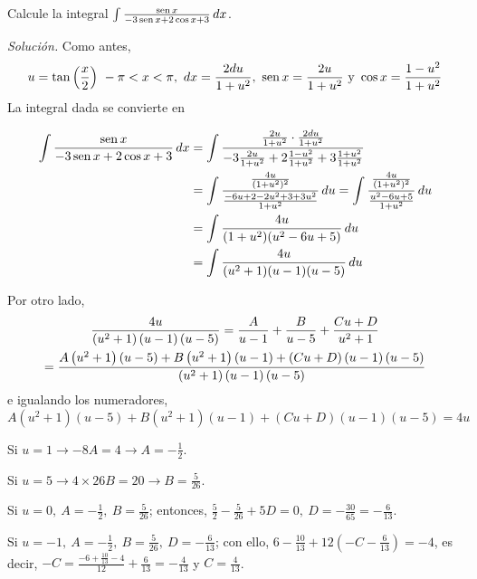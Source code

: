 \begin{ejemplo}
  Calcule la integral $\int \frac{\operatorname{sen} x}{-3\operatorname{sen} x+2\cos x+3}\, dx $.
\end{ejemplo}
\emph{Solución.} Como antes,
\begin{gather*}
  u=\tan \left( \frac{x}{2}\right)\ -\pi<x<\pi,\ dx=\frac{2du}{1+u^{2}},\ \operatorname{sen} x=\frac{2u}{1+u^{2}}\text{ y }\cos x=\frac{1-u^{2}}{1+u^{2}}
\end{gather*}
La integral dada se convierte en
\begin{small}
  \begin{align*}
    \int \frac{\operatorname{sen} x}{-3\operatorname{sen} x + 2\cos x + 3} \, dx
    &= \int \frac{\frac{2u}{1+u^{2}} \cdot \frac{2du}{1+u^{2}}}{-3\frac{2u}{1+u^{2}} + 2\frac{1-u^{2}}{1+u^{2}} + 3\frac{1+u^{2}}{1+u^{2}}}\\
    &= \int \frac{\frac{4u}{(1+u^{2})^{2}}}{\frac{-6u+2-2u^{2}+3+3u^{2}}{1+u^{2}}} \, du
    = \int \frac{\frac{4u}{(1+u^{2})^{2}}}{\frac{u^{2}-6u+5}{1+u^{2}}} \, du \\
    &= \int \frac{4u}{(1+u^{2})(u^{2}-6u+5)} \, du \\
    &= \int \frac{4u}{(u^{2}+1)(u-1)(u-5)} \, du
  \end{align*}
\end{small}

Por otro lado,
\begin{gather*}
  \frac{4u}{\left( u^{2}+1\right) \left( u-1\right) \left( u-5\right) }=\frac{%
  A}{u-1}+\frac{B}{u-5}+\frac{Cu+D}{u^{2}+1}\\
  =\frac{A\left( u^{2}+1\right) \left( u-5\right) +B\left( u^{2}+1\right)
    \left( u-1\right) +\left( Cu+D\right) \left( u-1\right) \left( u-5\right
  ) }{\left( u^{2}+1\right) \left( u-1\right) \left( u-5\right) }
\end{gather*}
e igualando los numeradores,
\[
  A\left( u^{2}+1\right) \left( u-5\right) +B\left( u^{2}+1\right) \left(
  u-1\right) +\left( Cu+D\right) \left( u-1\right) \left( u-5\right) =4u
\]

Si $u=1\rightarrow -8A=4\rightarrow A=-\frac{1}{2}$.

Si $u=5\rightarrow 4\times 26B=20\rightarrow B=\frac{5}{26}$.

Si $u=0,\ A=-\frac{1}{2},\ B=\frac{5}{26}$; entonces, $\frac{5}{2}-\frac{5}{26}+5D=0,\ D=-\frac{30}{65}=-\frac{6}{13}$.

Si $u=-1,\ A=-\frac{1}{2},\ B=\frac{5}{26},\ D=-\frac{6}{13}$; con ello, $6-\frac{10}{13}+12\left( -C-\frac{6}{13}\right) =-4$, es decir, $-C=\frac{-6+\frac{10}{13}-4}{12}+\frac{6}{13}=-\frac{4}{13}$ y $C=\frac{4%
}{13}$.

